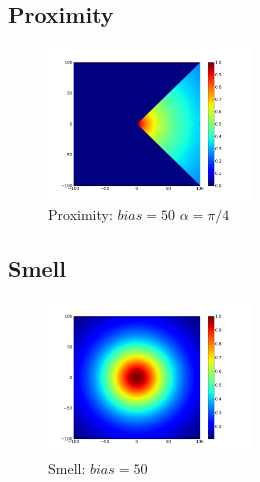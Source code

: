\documentclass[a4paper]{article}
\begin{document}
\subsection{Proximity}
\begin{figure}
	\vspace{-30pt}
	\begin{center}
		\includegraphics[width=0.48\textwidth]{graphs/proximity.png}
	\end{center}
	\vspace{-30pt}
	\caption{Proximity: $bias=50$ $\alpha=\pi/4$}
\end{figure}

\subsection{Smell}
\begin{figure}
	\vspace{-30pt}
	\begin{center}
		\includegraphics[width=0.48\textwidth]{graphs/smell.png}
	\end{center}
	\vspace{-30pt}
	\caption{Smell: $bias=50$}
\end{figure}
\end{document}
